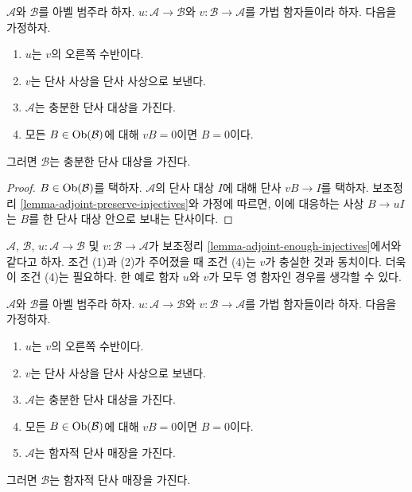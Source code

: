 \begin{lemma}
\label{lemma-adjoint-enough-injectives}
$\mathcal{A}$와 $\mathcal{B}$를 아벨 범주라 하자.
$u : \mathcal{A} \to \mathcal{B}$와
$v : \mathcal{B} \to \mathcal{A}$를 가법 함자들이라 하자.
다음을 가정하자.
\begin{enumerate}
\item $u$는 $v$의 오른쪽 수반이다.
\item $v$는 단사 사상을 단사 사상으로 보낸다.
\item $\mathcal{A}$는 충분한 단사 대상을 가진다.
\item 모든 $B \in \mathop{\mathrm{Ob}}\nolimits(\mathcal{B})$에 대해 $vB = 0$이면 $B = 0$이다.
\end{enumerate}
그러면 $\mathcal{B}$는 충분한 단사 대상을 가진다.
\end{lemma}

\begin{proof}
$B \in \mathop{\mathrm{Ob}}\nolimits(\mathcal{B})$를 택하자. $\mathcal{A}$의 단사 대상 $I$에
대해 단사 $vB \to I$를 택하자. 보조정리
\ref{lemma-adjoint-preserve-injectives}와 가정에 따르면, 이에 대응하는
사상 $B \to uI$는 $B$를 한 단사 대상 안으로 보내는 단사이다.
\end{proof}

\begin{remark}
\label{remark-faithfulness-needed}
$\mathcal{A}$, $\mathcal{B}$, $u : \mathcal{A} \to \mathcal{B}$ 및
$v : \mathcal{B} \to \mathcal{A}$가 보조정리
\ref{lemma-adjoint-enough-injectives}에서와 같다고 하자.
조건 (1)과 (2)가 주어졌을 때 조건 (4)는 $v$가 충실한 것과 동치이다.
더욱이 조건 (4)는 필요하다. 한 예로 함자 $u$와 $v$가 모두 영 함자인
경우를 생각할 수 있다.
\end{remark}

\begin{lemma}
\label{lemma-adjoint-functorial-injectives}
$\mathcal{A}$와 $\mathcal{B}$를 아벨 범주라 하자.
$u : \mathcal{A} \to \mathcal{B}$와
$v : \mathcal{B} \to \mathcal{A}$를 가법 함자들이라 하자.
다음을 가정하자.
\begin{enumerate}
\item $u$는 $v$의 오른쪽 수반이다.
\item $v$는 단사 사상을 단사 사상으로 보낸다.
\item $\mathcal{A}$는 충분한 단사 대상을 가진다.
\item 모든 $B \in \mathop{\mathrm{Ob}}\nolimits(\mathcal{B})$에 대해 $vB = 0$이면 $B = 0$이다.
\item $\mathcal{A}$는 함자적 단사 매장을 가진다.
\end{enumerate}
그러면 $\mathcal{B}$는 함자적 단사 매장을 가진다.
\end{lemma}

